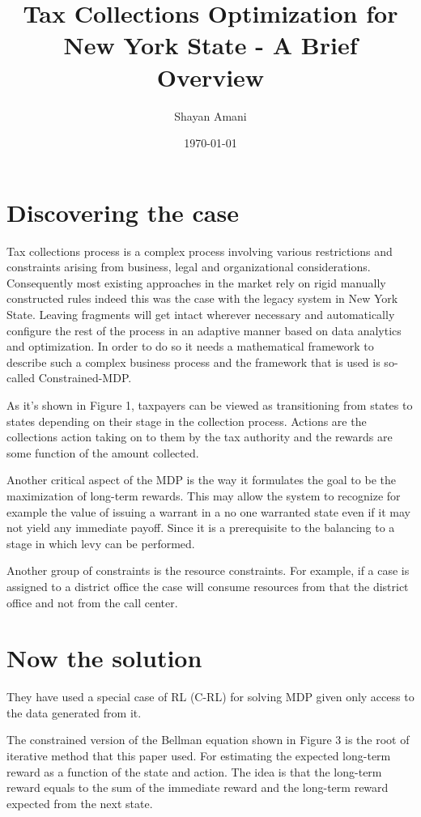 \documentclass[a4paper,12pt]{article}
\title{Tax Collections Optimization for New York State - A Brief Overview}
\author{Shayan Amani}
\date{\today}
\begin{document}
\maketitle

\section{Discovering the case}
 Tax collections process is a complex process involving various restrictions and constraints arising from business, legal and organizational considerations. Consequently most existing approaches in the market rely on rigid manually constructed rules indeed this was the case with the legacy system in New York State. Leaving fragments will get intact wherever necessary and automatically configure the rest of the process in an adaptive manner based on data analytics and optimization. In order to do so it needs a mathematical framework to describe such a complex business process and the framework that is used is so-called Constrained-MDP. 
 
 As it's shown in Figure 1, taxpayers can be viewed as transitioning from states to states depending on their stage in the collection process. Actions are the collections action taking on to them by the tax authority and the rewards are some function of the amount collected. 
 
 Another critical aspect of the MDP is the way it formulates the goal to be the maximization of long-term rewards. This may allow the system to recognize for example the value of issuing a warrant in a no one warranted state even if it may not yield any immediate payoff. Since it is a prerequisite to the balancing to a stage in which levy can be performed.
 
 Another group of constraints is the resource constraints. For example, if a case is assigned to a district office the case will consume resources from that the district office and not from the call center. 
 

\section{Now the solution}
 
They have used a special case of RL (C-RL) for solving MDP given only access to the data generated from it. 

The constrained version of the Bellman equation shown in Figure 3 is the root of iterative method that this paper used. For estimating the expected long-term reward as a function of the state and action. The idea is that the long-term reward equals to the sum of the immediate reward and the long-term reward expected from the next state.
\end{document}
